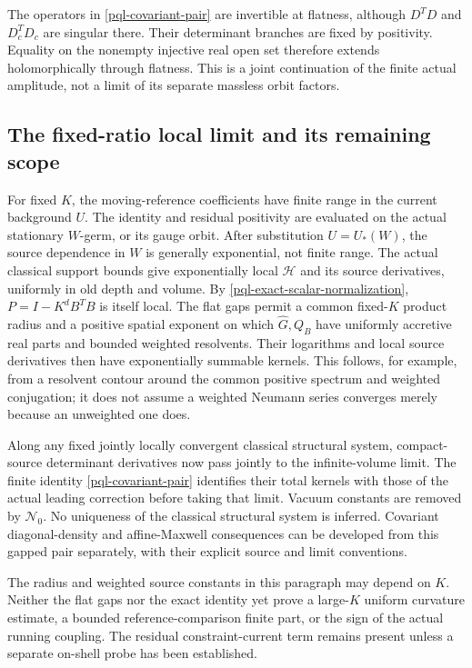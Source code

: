 \documentclass[11pt]{article}
\theoremstyle{remark}
\begin{document}
The operators in \eqref{pql-covariant-pair} are invertible at
flatness, although $D^TD$ and $D_c^TD_c$ are singular there.
Their determinant branches are fixed by positivity. Equality on the
nonempty injective real open set therefore extends holomorphically
through flatness. This is a joint continuation of the finite actual
amplitude, not a limit of its separate massless orbit factors.

\subsection{The fixed-ratio local limit and its remaining scope}
\label{pql-fixed-ratio}

For fixed $K$, the moving-reference coefficients have finite range in the current background $U$. The identity and residual positivity are evaluated on the actual stationary $W$-germ, or its gauge orbit. After substitution $U=U_*(W)$, the source dependence in $W$ is generally exponential, not finite range.
The actual classical support bounds give exponentially local
$\mathcal H$ and its source derivatives, uniformly in old depth and
volume. By \eqref{pql-exact-scalar-normalization},
$P=I-K^dB^TB$ is itself local. The flat gaps permit a common
fixed-$K$ product radius and a positive spatial exponent on which
$\widehat G,Q_B$ have uniformly accretive real parts and bounded
weighted resolvents. Their logarithms and local source derivatives
then have exponentially summable kernels. This follows, for example,
from a resolvent contour around the common positive spectrum and
weighted conjugation; it does not assume a weighted Neumann series
converges merely because an unweighted one does.

Along any fixed jointly locally convergent classical structural
system, compact-source determinant derivatives now pass jointly to
the infinite-volume limit. The finite identity
\eqref{pql-covariant-pair} identifies their total kernels with those
of the actual leading correction before taking that limit. Vacuum
constants are removed by $\mathcal N_0$. No uniqueness of the
classical structural system is inferred. Covariant diagonal-density
and affine-Maxwell consequences can be developed from this gapped
pair separately, with their explicit source and limit conventions.

The radius and weighted source constants in this paragraph may depend
on $K$. Neither the flat gaps nor the exact identity yet prove a
large-$K$ uniform curvature estimate, a bounded reference-comparison
finite part, or the sign of the actual running coupling. The residual
constraint-current term remains present unless a separate on-shell
probe has been established.
\end{document}
